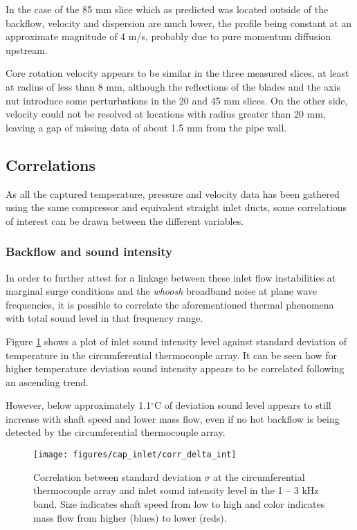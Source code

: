 In the case of the 85 mm slice which as predicted was located outside of the backflow, velocity and dispersion are much lower, the profile being constant at an approximate magnitude of 4 m/s, probably due to pure momentum diffusion upstream.

Core rotation velocity appears to be similar in the three measured slices, at least at radius of less than 8 mm, although the reflections of the blades and the axis nut introduce some perturbations in the 20 and 45 mm slices. On the other side, velocity could not be resolved at locations with radius greater than 20 mm, leaving a gap of missing data of about 1.5 mm from the pipe wall.

\subsection{Correlations}

As all the captured temperature, pressure and velocity data has been gathered using the same compressor and equivalent straight inlet ducts, some correlations of interest can be drawn between the different variables.

\subsubsection{Backflow and sound intensity}

In order to further attest for a linkage between these inlet flow instabilities at marginal surge conditions and the \emph{whoosh} broadband noise at plane wave frequencies, it is possible to correlate the aforementioned thermal phenomena with total sound level in that frequency range.

Figure \ref{fig:corr1} shows a plot of inlet sound intensity level against standard deviation of temperature in the circumferential thermocouple array. It can be seen how for higher temperature deviation sound intensity appears to be correlated following an ascending trend.

However, below approximately 1.1$^{\circ}$C of deviation sound level appears to still increase with shaft speed and lower mass flow, even if no hot backflow is being detected by the circumferential thermocouple array.

\begin{figure}[htb!]
\centering
\texttt{[image: figures/cap\_inlet/corr\_delta\_int]}
\caption[Correlation between temp. $\sigma$ and SIL]{Correlation between standard deviation $\sigma$ at the circumferential thermocouple array and inlet sound intensity level in the 1 -- 3 kHz band. Size indicates shaft speed from low to high and color indicates mass flow from higher (blues) to lower (reds).}
\label{fig:corr1}
\end{figure}


